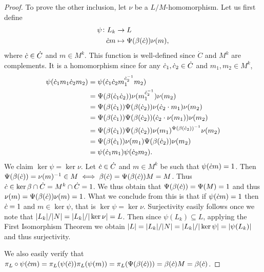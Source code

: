 \begin{proof}
    To prove the other inclusion, let $\nu$ be a $L/M$-homomorphism. 
    Let us first define
    \begin{align*}
        \psi \colon L_k &\rightarrow L \\
                \dot{c} m &\mapsto \Psi(\beta(\dot{c}))\nu(m),
    \end{align*}
    where $\dot{c} \in \dot C$ and $m \in M^k$.
    This function is well-defined since $\dot{C}$ and $M^k$ are complements. It is a homomorphism since for any $\dot{c}_1, \dot{c}_2 \in \dot{C}$ and $m_1, m_2 \in M^k$,
    \begin{align*}
        \psi(\dot{c}_1 m_1 \dot{c}_2 m_2) &= \psi(\dot{c}_1 \dot{c}_2 m_1^{\dot{c}_2^{-1}} m_2) \\
                                   &= \Psi(\beta(\dot{c}_1 \dot{c}_2)) \nu(m_1^{\dot{c}_2^{-1}}) \nu(m_2) \\
                                   &= \Psi(\beta(\dot{c}_1)) \Psi(\beta(\dot{c}_2)) \nu(\dot{c}_2 \cdot m_1) \nu(m_2) \\
                                   &= \Psi(\beta(\dot{c}_1)) \Psi(\beta(\dot{c}_2)) (\dot{c}_2 \cdot \nu(m_1)) \nu(m_2) \\
                                   &= \Psi(\beta(\dot{c}_1)) \Psi(\beta(\dot{c}_2)) \nu(m_1)^{\Psi(\beta(\dot{c}_2))^{-1}} \nu(m_2) \\
                                   &= \Psi(\beta(\dot{c}_1)) \nu(m_1) \Psi(\beta(\dot{c}_2)) \nu(m_2) \\
                                   &= \psi(\dot{c}_1 m_1) \psi(\dot{c}_2 m_2).
    \end{align*}
    We claim $\ker \psi = \ker \nu$. Let $\dot{c} \in \dot{C}$ and $m \in M^k$ be such that $\psi(\dot{c} m) = 1$. Then
    $\Psi(\beta(\dot{c})) = \nu(m)^{-1} \in M \iff \beta(\dot{c}) = \Psi(\beta(\dot{c}))M = M$. Thus $\dot{c} \in \ker \beta \cap \dot{C} = M^{k} \cap \dot{C} = 1$. We thus obtain that
    $\Psi(\beta(\dot{c})) = \Psi(M) = 1$ and thus $\nu(m) = \Psi(\beta(\dot{c}))\nu(m) = 1$. What we conclude from this is that if $\psi(\dot{c} m) = 1$ then $\dot{c} = 1$ and $m \in \ker \psi$, that is $\ker \psi = \ker \nu$.
    Surjectivity easily follows once we note that $| L_k |/| N | = | L_k |/| \ker \nu | = L$. Then since $\psi(L_k) \subseteq L$, applying the First Isomorphism Theorem we obtain $| L | = | L_k |/| N | = | L_k |/| \ker \psi | = | \psi(L_k) |$ and thus surjectivity.
        
    We also easily verify that $\pi_L \circ \psi(\dot{c} m) = \pi_L(\psi(\dot{c}))\pi_L(\psi(m))=\pi_L(\Psi(\beta(\dot{c}))) = \beta(\dot{c})M = \beta(\dot{c})$.
    \end{proof}

